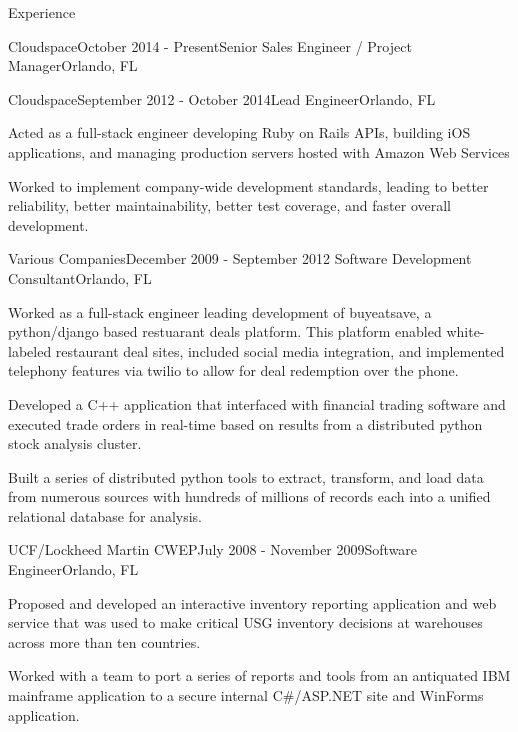 \documentclass{resume} %
\begin{document}
\begin{rSection}{Experience}
\begin{rSubsection}{Cloudspace}{October 2014 - Present}{Senior Sales Engineer / Project Manager}{Orlando, FL}
\end{rSubsection}




\begin{rSubsection}{Cloudspace}{September 2012 - October 2014}{Lead Engineer}{Orlando, FL}

\item Acted as a full-stack engineer developing Ruby on Rails APIs, building iOS applications, and managing production servers hosted with Amazon Web Services
\item Worked to implement company-wide development standards, leading to better reliability, better maintainability, better test coverage, and faster overall development.

\end{rSubsection}


\begin{rSubsection}{Various Companies}{December 2009 - September 2012}{ Software Development Consultant}{Orlando, FL}

\item Worked as a full-stack engineer leading development of buyeatsave, a python/django based restuarant deals platform.  This platform enabled white-labeled restaurant deal sites, included social media integration, and implemented telephony features via twilio to allow for deal redemption over the phone.
\item Developed a C++ application that interfaced with financial trading software and executed trade orders in real-time based on results from a distributed python stock analysis cluster.
\item Built a series of distributed python tools to extract, transform, and load data from numerous sources with hundreds of millions of records each into a unified relational database for analysis.


\end{rSubsection}


\begin{rSubsection}{UCF/Lockheed Martin CWEP}{July 2008 - November 2009}{Software Engineer}{Orlando, FL}

\item Proposed and developed an interactive inventory reporting application and  web service that was used to make critical USG inventory decisions at warehouses across more than ten countries.
\item Worked with a team to port a series of reports and tools from an antiquated IBM mainframe application to a secure internal C\#/ASP.NET site and WinForms application.

\end{rSubsection}


\end{rSection}
\end{document}
